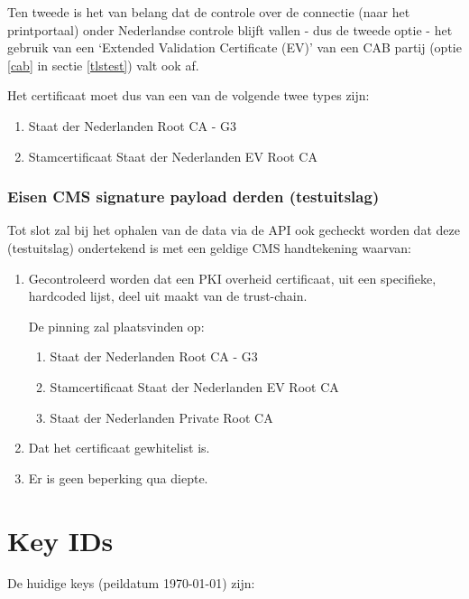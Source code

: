 \documentclass[11.0pt]{report}
\begin{document}
Ten tweede is het van belang dat de controle over de connectie (naar het printportaal) onder Nederlandse controle blijft vallen - dus de tweede optie - het gebruik van een `Extended Validation Certificate (EV)' van een CAB partij (optie \ref{cab} in  sectie \ref{tlstest}) valt ook af. 

Het certificaat moet dus van een van de volgende twee types zijn:

\begin{enumerate}
\item Staat der Nederlanden Root CA - G3
\item Stamcertificaat Staat der Nederlanden EV Root CA 
\end{enumerate}

\subsection{Eisen CMS signature payload derden (testuitslag)}

Tot slot zal bij het ophalen van de data via de API ook gecheckt worden dat deze (testuitslag) ondertekend is met een geldige CMS handtekening waarvan:

\begin{enumerate}
\item	Gecontroleerd worden dat een PKI overheid certificaat, uit een specifieke, hardcoded lijst, deel uit maakt van de trust-chain.

De pinning zal plaatsvinden op:

\begin{enumerate}
\item Staat der Nederlanden Root CA - G3
\item Stamcertificaat Staat der Nederlanden EV Root CA 
\item Staat der Nederlanden Private Root CA 
\end{enumerate}
\item Dat het certificaat gewhitelist is.
\item Er is geen beperking qua diepte.
\end{enumerate}

\appendix
\chapter{Key IDs}
\label{keyid}

De huidige keys (peildatum \today) zijn:\\
\end{document}
